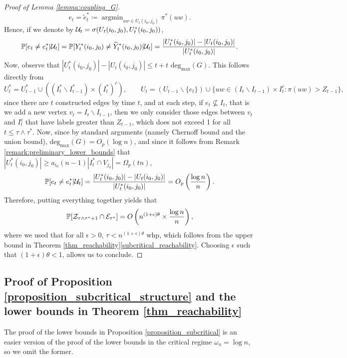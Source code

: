 \documentclass[11pt]{article}
\numberwithin{equation}{section}
\DeclareMathOperator{\argmin}{\mathrm{argmin}}
\theoremstyle{definition}
\newcommand\bP{{\mathbb P}}
\newcommand\cE{{\cal{E}}}
\newcommand\cU{{\cal{U}}}
\newcommand\cZ{{\cal{Z}}}
\newcommand{\wt}{\widetilde}
\begin{document}
\begin{proof}[Proof of Lemma \ref{lemma:coupling_G}]
$$e_t = \wt{e}^*_t \coloneqq \argmin_{uw \in U_t(i_0,j_0)} \pi^*(uw).$$ 
Hence, if we denote by $\cU_t = \sigma(U_t(i_0,j_0),U_t^*(i_0,j_0))$,
$$\bP[e_t\neq e^*_t|\cU_{t}] = \bP[Y_t^*(i_0,j_0) \neq \wt{Y}^*_t(i_0,j_0)|\cU_{t}] = \frac{|U^*_t(i_0,j_0)|-|U_t(i_0,j_0)|}{|U^*_t(i_0,j_0)|}.$$
Now, observe that $|U^*_t(i_0,j_0)|-|U_t(i_0,j_0)| \leq t+ t\textrm{ deg}_{\max}(G)$. %
This follows directly from 
$$ U_t^* = U^*_{t-1} \cup ((I^*_t\backslash I^*_{t-1}) \times (I^*_t)^c ), \quad \quad U_t = (U_{t-1} \backslash \{e_t\})\cup \{uw\in (I_t\backslash I_{t-1})\times I_t^c: \pi(uw)>Z_{t-1}\},$$
since there are $t$ constructed edges by time $t$, and at each step, if $e_t \not\subseteq I_t$, that is we add a new vertex $v_t = I_t\backslash I_{t-1}$, then we only consider those edges between $v_t$ and $I^c_t$ that have labels greater than $Z_{t-1}$, which does not exceed 1 for all $t \leq \tau\land \tau^*$. Now, since by standard arguments (namely Chernoff bound and the union bound), $\textrm{deg}_{\max}(G) = O_p(\log n)$, and since it follows from Remark \ref{remark:preliminary_lower_bounds} that $|U^*_t(i_0,j_0)| \geq a_{i_0} (n-1) |I^*_t \cap V_{j_0}| = \Omega_p(tn)$,
$$\bP[e_t\neq e^*_t|\cU_{t}]= \frac{|U^*_t(i_0,j_0)|-|U_t(i_0,j_0)|}{|U^*_t(i_0,j_0)|} = O_p\left(\frac{\log n}{n} \right).$$
Therefore, putting everything together yields that
$$ \bP[\cZ_{\tau \land \tau^* +1} \cap \cE_{\tau^*}] = O\left( n^{(1+\epsilon)\theta} \times \frac{\log n}{n}\right), $$
where we used that for all $\epsilon > 0$, $\tau < n^{(1+\epsilon)\theta}$ whp, which follows from the upper bound in Theorem \ref{thm_reachability}\ref{subcritical_reachability}. Choosing $\epsilon$ such that $(1+\epsilon)\theta < 1$, allows us to conclude.
\end{proof}

\subsection{Proof of Proposition \ref{proposition_subcritical_structure} and the lower bounds in Theorem \ref{thm_reachability}}
\label{proof_lower_bounds}

The proof of the lower bounds in Proposition \ref{proposition_subcritical} is an easier version of the proof of the lower bounds in the critical regime $\omega_n = \log n$, so we omit the former. 
\end{document}
